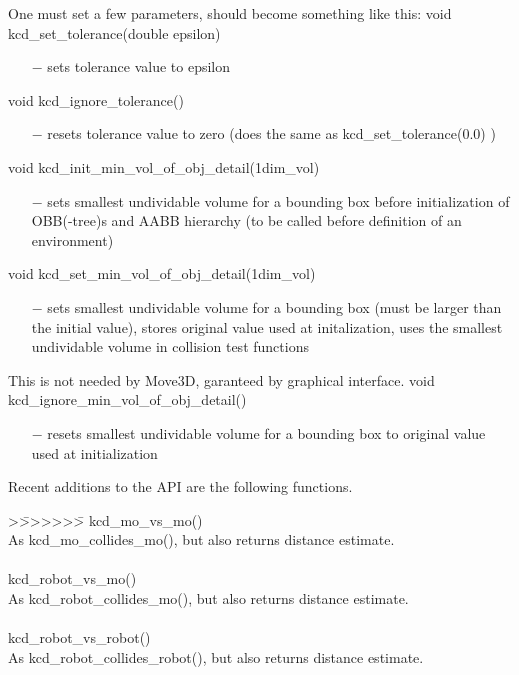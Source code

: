 One must set a few parameters, should become something like this: \newline
void kcd\_set\_tolerance(double epsilon)
\begin{itemize}
\item[$-$] sets tolerance value to epsilon
\end{itemize}
void kcd\_ignore\_tolerance()
\begin{itemize}
\item[$-$] resets tolerance value to zero 
  (does the same as kcd\_set\_tolerance(0.0) )
\end{itemize}
void kcd\_init\_min\_vol\_of\_obj\_detail(1dim\_vol)
\begin{itemize}
\item[$-$] sets smallest undividable volume for a bounding box
  before initialization of OBB(-tree)s and AABB hierarchy
  (to be called before definition of an environment)
\end{itemize}
void kcd\_set\_min\_vol\_of\_obj\_detail(1dim\_vol)
\begin{itemize}
\item[$-$] sets smallest undividable volume for a bounding box (must be
  larger than the initial value), stores original value used 
  at initalization, uses the smallest undividable volume in 
  collision test functions
\end{itemize}
This is not needed by Move3D, garanteed by graphical interface.\newline
void kcd\_ignore\_min\_vol\_of\_obj\_detail()
\begin{itemize}
\item[$-$] resets smallest undividable volume for a bounding box to
  original value used at initialization
\end{itemize}
Recent additions to the API are the following functions.
\begin{tabbing}
\vspace{-5mm}
>\=>>>>>>\= \kill
kcd\_mo\_vs\_mo()\\
\>  As kcd\_mo\_collides\_mo(), but also returns distance estimate.\\
\>\\
kcd\_robot\_vs\_mo()\\
\>  As kcd\_robot\_collides\_mo(), but also returns distance estimate.\\
\>\\
kcd\_robot\_vs\_robot()\\
\>  As kcd\_robot\_collides\_robot(), but also returns distance estimate.
\vspace{-4mm}
\end{tabbing}

